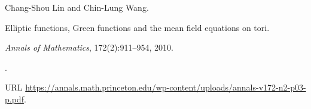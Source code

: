 Chang-Shou Lin and Chin-Lung Wang.

\newblock Elliptic functions, Green functions and the mean field equations on tori.

\newblock \emph{Annals of Mathematics}, 172(2):911--954, 2010.

\newblock {}.

\newblock URL
\url{https://annals.math.princeton.edu/wp-content/uploads/annals-v172-n2-p03-p.pdf}.


